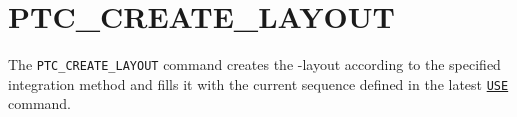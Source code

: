 \section{PTC\_CREATE\_LAYOUT}
\label{sec:ptc-create-layout}

The \texttt{PTC\_CREATE\_LAYOUT} command creates the \ptc-layout
according to  the specified integration method and fills it with the
current \madx sequence defined in the latest
\hyperref[sec:use]{\texttt{USE}} command.


